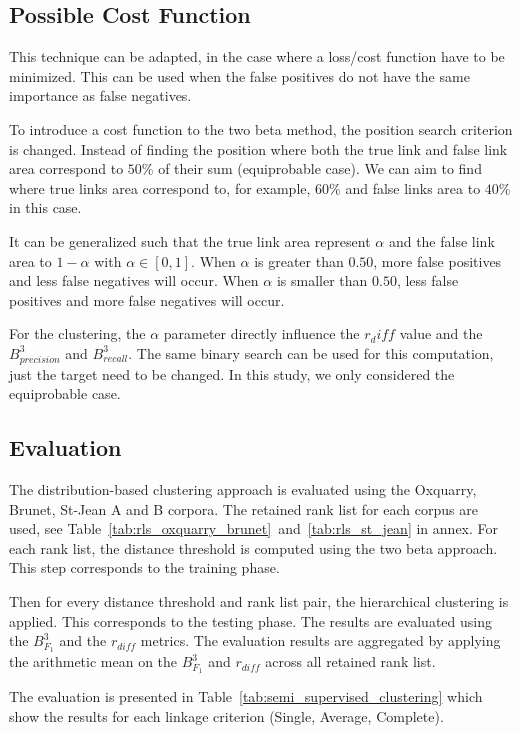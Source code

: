 \subsection{Possible Cost Function}

This technique can be adapted, in the case where a loss/cost function have to be minimized.
This can be used when the false positives do not have the same importance as false negatives.

To introduce a cost function to the two beta method, the position search criterion is changed.
Instead of finding the position where both the true link and false link area correspond to $50\%$ of their sum (equiprobable case).
We can aim to find where true links area correspond to, for example, $60\%$ and false links area to $40\%$ in this case.

It can be generalized such that the true link area represent $\alpha$ and the false link area to $1-\alpha$ with $\alpha \in \left[0,1\right]$.
When $\alpha$ is greater than $0.50$, more false positives and less false negatives will occur.
When $\alpha$ is smaller than $0.50$, less false positives and more false negatives will occur.

For the clustering, the $\alpha$ parameter directly influence the $r_diff$ value and the $B^3_{precision}$ and $B^3_{recall}$.
The same binary search can be used for this computation, just the target need to be changed.
In this study, we only considered the equiprobable case.

\subsection{Evaluation}

The distribution-based clustering approach is evaluated using the Oxquarry, Brunet, St-Jean A and B corpora.
The retained rank list for each corpus are used, see Table~\ref{tab:rls_oxquarry_brunet}~and~\ref{tab:rls_st_jean} in annex.
For each rank list, the distance threshold is computed using the two beta approach.
This step corresponds to the training phase.

Then for every distance threshold and rank list pair, the hierarchical clustering is applied.
This corresponds to the testing phase.
The results are evaluated using the $B^3_{F_1}$ and the $r_{diff}$ metrics.
The evaluation results are aggregated by applying the arithmetic mean on the $B^3_{F_1}$ and $r_{diff}$ across all retained rank list.

The evaluation is presented in Table~\ref{tab:semi_supervised_clustering} which show the results for each linkage criterion (Single, Average, Complete).

